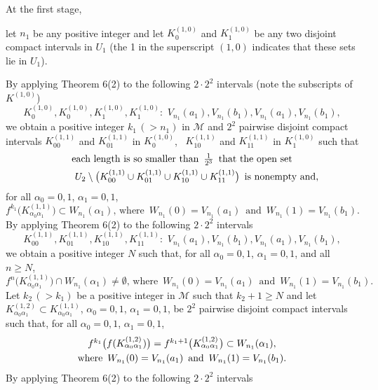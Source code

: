 \documentclass[12pt]{article}
\newcommand{\al}{\alpha}
\begin{document}
At the first stage, 

let $n_1$ be any positive integer and let $K_0^{(1,0)}$ and $K_1^{(1,0)}$ be any two disjoint compact intervals in $U_1$ \big(the 1 in the superscript $(1,0)$ indicates that these sets lie in $U_1$\big).

By applying Theorem 6(2) to the following $2 \cdot 2^2$ intervals \big(note the subscripts of $K^{(1,0)}$\big)
$$K_0^{(1,0)}, K_0^{(1,0)}, K_1^{(1,0)}, K_1^{(1,0)}: \,\, V_{n_1}(a_1), V_{n_1}(b_1), V_{n_1}(a_1), V_{n_1}(b_1),$$ 
we obtain a positive integer $k_1 \, (> n_1)$ in $\mathcal M$ and $2^2$ pairwise disjoint compact intervals $K_{00}^{(1,1)}$ and $K_{01}^{(1,1)}$ in $K_{0}^{(1,0)}$, \, $K_{10}^{(1,1)}$ and $K_{11}^{(1,1)}$ in $K_{1}^{(1,0)}$ such that  
{\large 
\begin{multline*}
$$
\text{each length is so smaller than} \,\,\, \frac 1{2^3} \,\,\, \text{that the open set} \\ 
\qquad\quad U_2 \setminus \big(K_{00}^{(1,1)} \cup K_{01}^{(1,1)} \cup K_{10}^{(1,1)} \cup K_{11}^{(1,1)}\big) \,\,\, \text{is nonempty and},
$$
\end{multline*}}
for all $\al_0 = 0, 1$, $\al_1 = 0, 1$, 
{\large 
$$
f^{k_1}\big(K_{\al_0\al_1}^{(1,1)}\big) \subset W_{n_1}(\al_1), \, \text{where} \,\,\, W_{n_1}(0) = V_{n_1}(a_1) \,\,\, \text{and} \,\,\, W_{n_1}(1) = V_{n_1}(b_1).
$$}
\indent By applying Theorem 6(2) to the following $2 \cdot 2^2$ intervals
$$
K_{00}^{(1,1)}, K_{01}^{(1,1)}, K_{10}^{(1,1)}, K_{11}^{(1,1)}: \,\, V_{n_1}(a_1), V_{n_1}(b_1), V_{n_1}(a_1), V_{n_1}(b_1),
$$ 
we obtain a positive integer $N$ such that,
for all $\al_0 = 0, 1$, $\al_1 = 0, 1$, and all $n \ge N$, 
$$
f^n\big(K_{\al_0\al_1}^{(1,1)}\big) \cap W_{n_1}(\al_1) \ne \emptyset, \, \text{where} \,\,\, W_{n_1}(0) = V_{n_1}(a_1) \,\,\, \text{and} \,\,\, W_{n_1}(1) = V_{n_1}(b_1).
$$
\indent Let $k_2 \, (> k_1)$ be a positive integer in $\mathcal M$ such that $k_2 +1 \ge N$ and let $K_{\al_0\al_1}^{(1,2)} \subset K_{\al_0\al_1}^{(1,1)}$, $\al_0 = 0, 1$, $\al_1 = 0, 1$, be $2^2$ pairwise disjoint compact intervals such that,  
for all $\al_0 = 0, 1$, $\al_1 = 0, 1$, 
{\large 
\begin{multline*}
$$
f^{k_1}\big(f(K_{\al_0\al_1}^{(1,2)})\big) = f^{k_1+1}\big(K_{\al_0\al_1}^{(1,2)}\big) \subset W_{n_1}(\al_1), \\ \text{where} \,\,\, W_{n_1}(0) = V_{n_1}(a_1) \,\,\, \text{and} \,\,\, W_{n_1}(1) = V_{n_1}(b_1).
$$
\end{multline*}}
\indent By applying Theorem 6(2) to the following $2 \cdot 2^2$ intervals 
\end{document}
